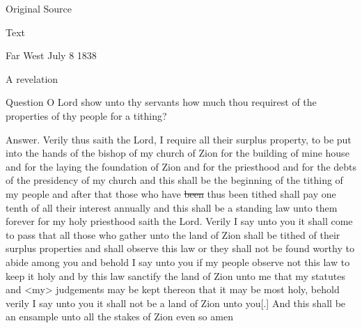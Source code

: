 				
				\begin{description}
					\item[Original Source]
				\end{description}
				
				
				\begin{description}
					\item[Text]
				\end{description}
				
					Far West July 8 1838

					A revelation

					Question O Lord show unto thy servants how much thou requirest of the properties of thy people for a tithing?

					Answer. Verily thus saith the Lord, I require all their surplus property, to be put into the hands of the bishop of my church of Zion for the building of mine house and for the laying the foundation of Zion and for the priesthood and for the debts of the presidency of my church and this shall be the beginning of the tithing of my people and after that those who have \sout{been} thus been tithed shall pay one tenth of all their interest annually and this shall be a standing law unto them forever for my holy priesthood saith the Lord. Verily I say unto you it shall come to pass that all those who gather unto the land of Zion shall be tithed of their surplus properties and shall observe this law or they shall not be found worthy to abide among you and behold I say unto you if my people observe not this law to keep it holy and by this law sanctify the land of Zion unto me that my statutes and <my> judgements may be kept thereon that it may be most holy, behold verily I say unto you it shall not be a land of Zion unto you[.] And this shall be an ensample unto all the stakes of Zion even so amen

